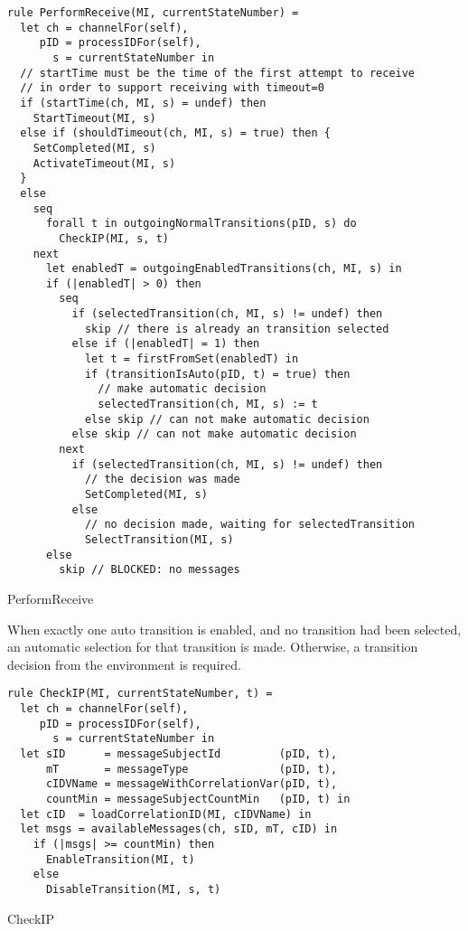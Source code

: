 \begin{listing}[htbp]
\begin{verbatim}
rule PerformReceive(MI, currentStateNumber) =
  let ch = channelFor(self),
     pID = processIDFor(self),
       s = currentStateNumber in
  // startTime must be the time of the first attempt to receive
  // in order to support receiving with timeout=0
  if (startTime(ch, MI, s) = undef) then
    StartTimeout(MI, s)
  else if (shouldTimeout(ch, MI, s) = true) then {
    SetCompleted(MI, s)
    ActivateTimeout(MI, s)
  }
  else
    seq
      forall t in outgoingNormalTransitions(pID, s) do
        CheckIP(MI, s, t)
    next
      let enabledT = outgoingEnabledTransitions(ch, MI, s) in
      if (|enabledT| > 0) then
        seq
          if (selectedTransition(ch, MI, s) != undef) then
            skip // there is already an transition selected
          else if (|enabledT| = 1) then
            let t = firstFromSet(enabledT) in
            if (transitionIsAuto(pID, t) = true) then
              // make automatic decision
              selectedTransition(ch, MI, s) := t
            else skip // can not make automatic decision
          else skip // can not make automatic decision
        next
          if (selectedTransition(ch, MI, s) != undef) then
            // the decision was made
            SetCompleted(MI, s)
          else
            // no decision made, waiting for selectedTransition
            SelectTransition(MI, s)
      else
        skip // BLOCKED: no messages
\end{verbatim}
\caption{PerformReceive}
\label{lst:shortasm:PerformReceive}
\end{listing}




When exactly one auto transition is enabled, and no transition had been selected, an automatic selection for that transition is made. Otherwise, a transition decision from the environment is required.


\begin{listing}[htbp]
\begin{verbatim}
rule CheckIP(MI, currentStateNumber, t) =
  let ch = channelFor(self),
     pID = processIDFor(self),
       s = currentStateNumber in
  let sID      = messageSubjectId         (pID, t),
      mT       = messageType              (pID, t),
      cIDVName = messageWithCorrelationVar(pID, t),
      countMin = messageSubjectCountMin   (pID, t) in
  let cID  = loadCorrelationID(MI, cIDVName) in
  let msgs = availableMessages(ch, sID, mT, cID) in
    if (|msgs| >= countMin) then
      EnableTransition(MI, t)
    else
      DisableTransition(MI, s, t)
\end{verbatim}
\caption{CheckIP}
\label{lst:shortasm:CheckIP}
\end{listing}


